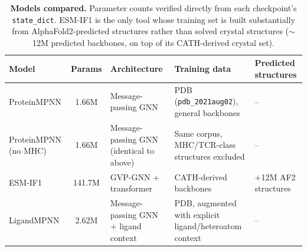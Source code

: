 \documentclass[letterpaper]{article}
\begin{document}
\begin{table}[p]
\renewcommand{\thetable}{S1}
\centering
\small
\begin{tabular}{@{}lcp{4.2cm}p{5.2cm}p{2.6cm}@{}}
\toprule
Model & Params & Architecture & Training data & Predicted structures \\
\midrule
ProteinMPNN & 1.66M & Message-passing GNN & PDB (\texttt{pdb\_2021aug02}), general backbones & -- \\[2pt]
ProteinMPNN (no MHC) & 1.66M & Message-passing GNN (identical to above) & Same corpus, MHC/TCR-class structures excluded & -- \\[2pt]
ESM-IF1 & 141.7M & GVP-GNN + transformer & CATH-derived backbones & +12M AF2 structures \\[2pt]
LigandMPNN & 2.62M & Message-passing GNN + ligand context & PDB, augmented with explicit ligand/heteroatom context & -- \\
\bottomrule
\end{tabular}
\caption{\textbf{Models compared.} Parameter counts verified directly from each
checkpoint's \texttt{state\_dict}. ESM-IF1 is the only tool whose training set is built substantially
from AlphaFold2-predicted structures rather than solved crystal structures ($\sim$12M predicted backbones,
on top of its CATH-derived crystal set).}
\label{tab:models}
\end{table}
\end{document}
